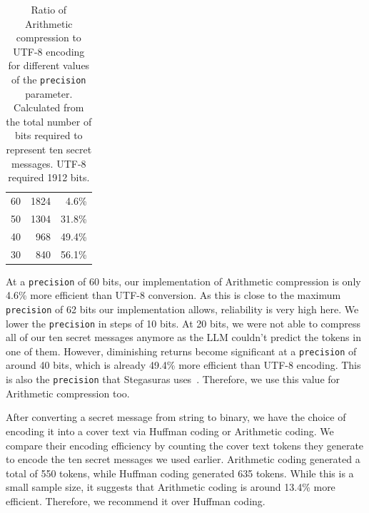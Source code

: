 \begin{table}
	\centering
	\begin{tabular}{@{} p{2.5cm} rr @{}} %
		\toprule
		\tableheadline{Precision} & \tableheadline{Bits} & \tableheadline{Ratio} \\
		\midrule
		60                        &                 1824 &                 4.6\% \\
		50                        &                 1304 &                31.8\% \\
		40                        &                  968 &                49.4\% \\
		30                        &                  840 &                56.1\% \\
		\bottomrule
	\end{tabular}
	\caption[Compression]{Ratio of Arithmetic compression to UTF-8 encoding for different values of the \lstinline|precision| parameter. Calculated from the total number of bits required to represent ten secret messages. UTF-8 required 1912 bits.}
	\label{tab:compression}
\end{table}

At a \lstinline|precision| of 60 bits, our implementation of Arithmetic compression is only 4.6\% more efficient than UTF-8 conversion. As this is close to the maximum \lstinline|precision| of 62 bits our implementation allows, reliability is very high here. We lower the \lstinline|precision| in steps of 10 bits. At 20 bits, we were not able to compress all of our ten secret messages anymore as the \gls{LLM} couldn't predict the tokens in one of them. However, diminishing returns become significant at a \lstinline|precision| of around 40 bits, which is already 49.4\% more efficient than UTF-8 encoding. This is also the \lstinline|precision| that Stegasuras uses~\cite{zieglerHarvardnlpNeuralSteganography2025}. Therefore, we use this value for Arithmetic compression too.

After converting a secret message from string to binary, we have the choice of encoding it into a cover text via Huffman coding or Arithmetic coding. We compare their encoding efficiency by counting the cover text tokens they generate to encode the ten secret messages we used earlier. Arithmetic coding generated a total of 550 tokens, while Huffman coding generated 635 tokens. While this is a small sample size, it suggests that Arithmetic coding is around 13.4\% more efficient. Therefore, we recommend it over Huffman coding.

